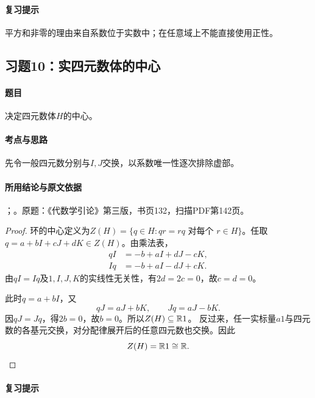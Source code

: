 \paragraph{复习提示}

平方和非零的理由来自系数位于实数中；在任意域上不能直接使用正性。



\subsection{习题10：实四元数体的中心}

\label{ex:3:10}

\paragraph{题目}

决定四元数体$H$的中心。

\paragraph{考点与思路}

先令一般四元数分别与$I,J$交换，以系数唯一性逐次排除虚部。

\paragraph{所用结论与原文依据}

；。原题：《代数学引论》第三版，书页132，扫描PDF第142页。


\begin{proof}

环的中心定义为$Z(H)=\{q\in H:qr=rq\text{ 对每个 }r\in H\}$。任取$q=a+bI+cJ+dK\in Z(H)$。由乘法表，
\begin{align*}
qI&=-b+aI+dJ-cK,\\
Iq&=-b+aI-dJ+cK.
\end{align*}
由$qI=Iq$及$1,I,J,K$的实线性无关性，有$2d=2c=0$，故$c=d=0$。

此时$q=a+bI$，又
\[
qJ=aJ+bK,\qquad Jq=aJ-bK.
\]
因$qJ=Jq$，得$2b=0$，故$b=0$。所以$Z(H)\subseteq\mathbb R1$。
反过来，任一实标量$a1$与四元数的各基元交换，对分配律展开后的任意四元数也交换。因此
\[
Z(H)=\mathbb R1\cong\mathbb R.
\]

\end{proof}

\paragraph{复习提示}

